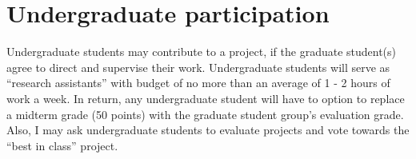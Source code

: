 \documentclass[11pt,onecolumn]{article}
\begin{document}
\section*{Undergraduate participation}

Undergraduate students may contribute to a project, if the graduate student(s) agree to direct and supervise their work. Undergraduate students will serve as ``research assistants'' with budget of no more than an average of 1 - 2 hours of work a week. In return, any undergraduate student will have to option to replace a midterm grade (50 points) with the graduate student group's evaluation grade. Also, I may ask undergraduate students to evaluate projects and vote towards the ``best in class'' project.
\end{document}
